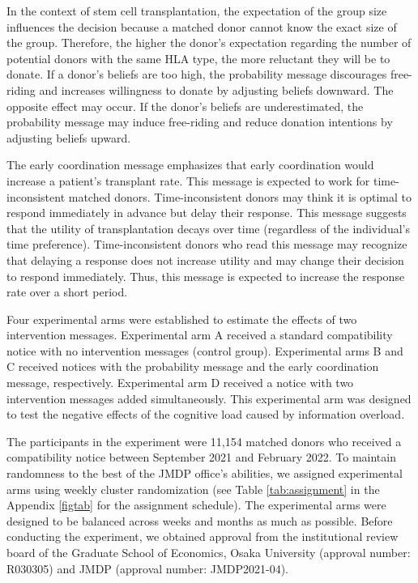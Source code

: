 \documentclass[12pt, a4paper]{article}
\begin{document}
In the context of stem cell transplantation, the expectation of the group size influences the decision because a matched donor cannot know the exact size of the group. Therefore, the higher the donor's expectation regarding the number of potential donors with the same HLA type, the more reluctant they will be to donate. If a donor's beliefs are too high, the probability message discourages free-riding and increases willingness to donate by adjusting beliefs downward. The opposite effect may occur. If the donor's beliefs are underestimated, the probability message may induce free-riding and reduce donation intentions by adjusting beliefs upward.

The early coordination message emphasizes that early coordination would increase a patient's transplant rate. This message is expected to work for time-inconsistent matched donors. Time-inconsistent donors may think it is optimal to respond immediately in advance but delay their response. This message suggests that the utility of transplantation decays over time (regardless of the individual's time preference). Time-inconsistent donors who read this message may recognize that delaying a response does not increase utility and may change their decision to respond immediately. Thus, this message is expected to increase the response rate over a short period.

Four experimental arms were established to estimate the effects of two intervention messages. Experimental arm A received a standard compatibility notice with no intervention messages (control group). Experimental arms B and C received notices with the probability message and the early coordination message, respectively. Experimental arm D received a notice with two intervention messages added simultaneously. This experimental arm was designed to test the negative effects of the cognitive load caused by information overload.

The participants in the experiment were 11,154 matched donors who received a compatibility notice between September 2021 and February 2022. To maintain randomness to the best of the JMDP office's abilities, we assigned experimental arms using weekly cluster randomization (see Table \ref{tab:assignment} in the Appendix \ref{figtab} for the assignment schedule). The experimental arms were designed to be balanced across weeks and months as much as possible. Before conducting the experiment, we obtained approval from the institutional review board of the Graduate School of Economics, Osaka University (approval number: R030305) and JMDP (approval number: JMDP2021-04).
\end{document}

